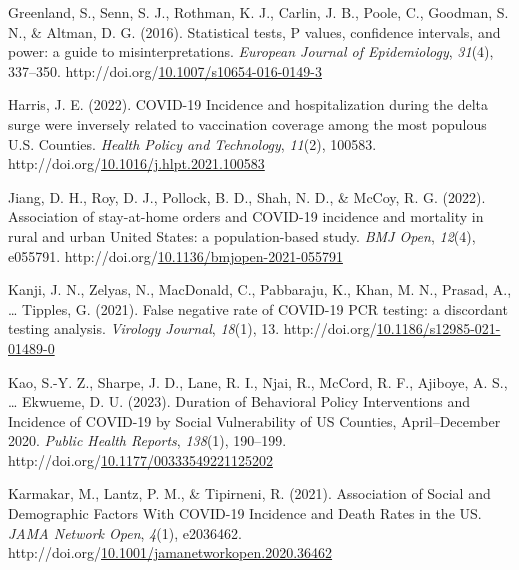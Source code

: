 \documentclass[12pt,twoside]{smiththesis}
\newlength{\cslhangindent}
\newenvironment{CSLReferences}[2] %
 {%
\setlength{\parindent}{0pt}
\ifodd #1 \everypar{\setlength{\hangindent}{\cslhangindent}}\ignorespaces\fi
\ifnum #2 > 0
\setlength{\parskip}{#2\baselineskip}
  \fi
}%
{}
\begin{document}
\begin{CSLReferences}{1}{0}
\leavevmode{}%
Greenland, S., Senn, S. J., Rothman, K. J., Carlin, J. B., Poole, C., Goodman, S. N., \& Altman, D. G. (2016). Statistical tests, P values, confidence intervals, and power: a guide to misinterpretations. \emph{European Journal of Epidemiology}, \emph{31}(4), 337--350. http://doi.org/\href{https://doi.org/10.1007/s10654-016-0149-3}{10.1007/s10654-016-0149-3}

\leavevmode{}%
Harris, J. E. (2022). COVID-19 Incidence and hospitalization during the delta surge were inversely related to vaccination coverage among the most populous U.S. Counties. \emph{Health Policy and Technology}, \emph{11}(2), 100583. http://doi.org/\href{https://doi.org/10.1016/j.hlpt.2021.100583}{10.1016/j.hlpt.2021.100583}

\leavevmode{}%
Jiang, D. H., Roy, D. J., Pollock, B. D., Shah, N. D., \& McCoy, R. G. (2022). Association of stay-at-home orders and COVID-19 incidence and mortality in rural and urban United States: a population-based study. \emph{BMJ Open}, \emph{12}(4), e055791. http://doi.org/\href{https://doi.org/10.1136/bmjopen-2021-055791}{10.1136/bmjopen-2021-055791}

\leavevmode{}%
Kanji, J. N., Zelyas, N., MacDonald, C., Pabbaraju, K., Khan, M. N., Prasad, A., \ldots{} Tipples, G. (2021). False negative rate of COVID-19 PCR testing: a discordant testing analysis. \emph{Virology Journal}, \emph{18}(1), 13. http://doi.org/\href{https://doi.org/10.1186/s12985-021-01489-0}{10.1186/s12985-021-01489-0}

\leavevmode{}%
Kao, S.-Y. Z., Sharpe, J. D., Lane, R. I., Njai, R., McCord, R. F., Ajiboye, A. S., \ldots{} Ekwueme, D. U. (2023). Duration of Behavioral Policy Interventions and Incidence of COVID-19 by Social Vulnerability of US Counties, April--December 2020. \emph{Public Health Reports}, \emph{138}(1), 190--199. http://doi.org/\href{https://doi.org/10.1177/00333549221125202}{10.1177/00333549221125202}

\leavevmode{}%
Karmakar, M., Lantz, P. M., \& Tipirneni, R. (2021). Association of Social and Demographic Factors With COVID-19 Incidence and Death Rates in the US. \emph{JAMA Network Open}, \emph{4}(1), e2036462. http://doi.org/\href{https://doi.org/10.1001/jamanetworkopen.2020.36462}{10.1001/jamanetworkopen.2020.36462}


\end{CSLReferences}
\end{document}
